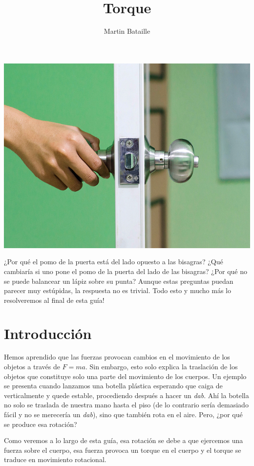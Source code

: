 \documentclass[letterpaper]{article}
\author{Martin Bataille}
\date{}
\title{\bf Torque}
\begin{document}
\maketitle
\thispagestyle{fancy}
\begin{center}
\includegraphics[scale=1.2]{portada.jpg}
\end{center}
\pagebreak

¿Por qué el pomo de la puerta está del lado opuesto a las bisagras? ¿Qué cambiaría si uno pone el pomo de la puerta del lado de las bisagras? ¿Por qué no se puede balancear un lápiz sobre su punta? Aunque estas preguntas puedan parecer muy estúpidas, la respuesta no es trivial. Todo esto y mucho más lo resolveremos al final de esta guía!

\section*{Introducción}

Hemos aprendido que las fuerzas provocan cambios en el movimiento de los objetos a través de $F = ma$. Sin embargo, esto solo explica la traslación de los objetos que constituye solo una parte del movimiento de los cuerpos. Un ejemplo se presenta cuando lanzamos una botella plástica esperando que caiga de verticalmente y quede estable, procediendo después a hacer un \emph{dab}. Ahí la botella no solo se traslada de nuestra mano hasta el piso (de lo contrario sería demasiado fácil y no se merecería un \emph{dab}), sino que también rota en el aire. Pero, ¿por qué se produce esa rotación?

Como veremos a lo largo de esta guía, esa rotación se debe a que ejercemos una fuerza sobre el cuerpo, esa fuerza provoca un torque en el cuerpo y el torque se traduce en movimiento rotacional.
\end{document}
